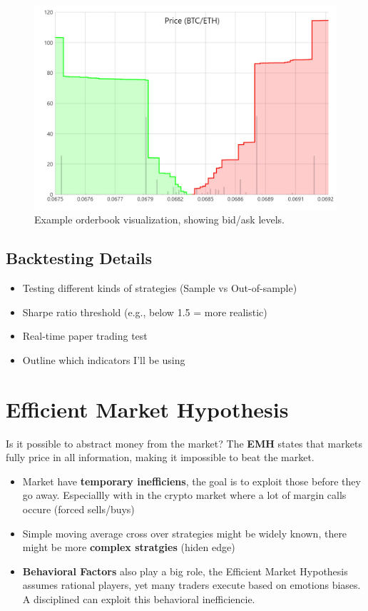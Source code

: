 \documentclass[9pt,a4paper,twocolumn,twoside]{tau-class/tau}
\begin{document}
\begin{figure}[H]
    \centering
    \includegraphics[width=0.85\columnwidth]{figures/orderbook.png}
    \caption{Example orderbook visualization, showing bid/ask levels.}
    \label{fig:orderbook}
\end{figure}

\subsection{Backtesting Details}
\begin{itemize}
  \item Testing different kinds of strategies (Sample vs Out-of-sample)
  \item Sharpe ratio threshold (e.g., below 1.5 = more realistic)
  \item Real-time paper trading test
  \item Outline which indicators I’ll be using
\end{itemize}

\section{Efficient Market Hypothesis}

Is it possible to abstract money from the market? The \textbf{EMH} states that markets fully price in all information, making it impossible to beat the market.

\begin{itemize}
    \item Market have \textbf{temporary inefficiens}, the goal is to exploit those before they go away. Especiallly with in the crypto market where a lot of margin calls occure (forced sells/buys)
    \item Simple moving average cross over strategies might be widely known, there might be more \textbf{complex stratgies} (hiden edge)
    \item \textbf{Behavioral Factors} also play a big role, the Efficient Market Hypothesis assumes rational players, yet many traders execute based on emotions biases. A disciplined can exploit this behavioral inefficiencie.
\end{itemize}





\end{document}
